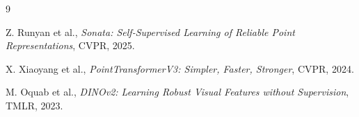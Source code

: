 \documentclass[11pt, a4paper]{article}
\begin{document}

\begin{thebibliography}{9}

Z. Runyan et al.,
\textit{Sonata: Self-Supervised Learning of Reliable Point Representations},
CVPR, 2025.

X. Xiaoyang et al.,
\textit{PointTransformerV3: Simpler, Faster, Stronger},
CVPR, 2024.

M. Oquab et al.,
\textit{DINOv2: Learning Robust Visual Features without Supervision},
TMLR, 2023.

\end{thebibliography}
\end{document}
